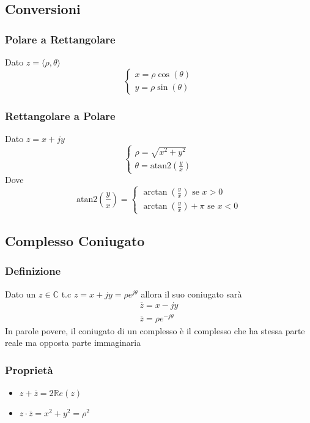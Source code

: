 \subsection{Conversioni}
\subsubsection{Polare a Rettangolare}
Dato $z = \langle\rho, \theta\rangle $
\begin{equation}
    \begin{cases}
        x = \rho\cos\left(\theta\right)\\
        y = \rho\sin\left(\theta\right)
    \end{cases}
\end{equation}

\subsubsection{Rettangolare a Polare}
Dato $z = x + jy$
\begin{equation}
    \begin{cases}
        \rho = \sqrt{x^2 + y^2}\\
        \theta = \text{atan2}\left(\frac{y}{x}\right)
    \end{cases}
\end{equation}
Dove
\begin{equation}
    \text{atan2}\left(\frac{y}{x}\right) = \begin{cases}
        \arctan\left(\frac{y}{x}\right) \text{ se } x > 0 \\
        \arctan\left(\frac{y}{x}\right) + \pi \text{ se } x < 0
    \end{cases}
\end{equation}

\subsection{Complesso Coniugato}
\subsubsection{Definizione}
Dato un $z \in \mathbb{C}$ t.c $z = x + jy = \rho e^{j\theta}$ allora il suo coniugato sarà
\begin{eqnarray}
    \overline{z} =  x - jy \\
    \overline{z} = \rho e^{-j\theta}
\end{eqnarray}
In parole povere, il coniugato di un complesso è il complesso che ha stessa parte reale ma opposta parte immaginaria
\subsubsection{Proprietà} \label{prop: coniugato}
\begin{itemize}
    \item $\displaystyle z + \overline{z} = 2 \mathbb{R}e(z)$
    \item $z \cdot \overline{z} = x^2 + y^2 = \rho^2$
\end{itemize}